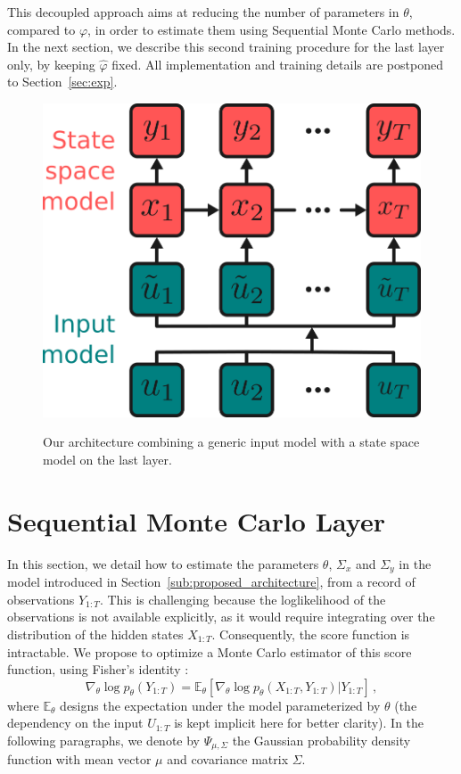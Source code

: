 \documentclass[conference]{IEEEtran}
\begin{document}
This decoupled approach aims at reducing the number of parameters in $\theta$, compared to $\varphi$, in order to estimate them using Sequential Monte Carlo methods.
In the next section, we describe this second training procedure for the last layer only, by keeping $\hat \varphi$ fixed.
All implementation and training details are postponed to Section~\ref{sec:exp}.

\begin{figure}[htpb]
	\centering
	\caption{Our architecture combining a generic input model with a state space model on the last layer.}
	\includegraphics[width=0.7\linewidth]{architecture.png}
	\label{fig:architecture}
\end{figure}

\section{Sequential Monte Carlo Layer}%
\label{sub:uncertainty_estimation}
In this section, we detail how to estimate the parameters $\theta$, $\Sigma_x$ and $\Sigma_y$ in the model introduced in Section~\ref{sub:proposed_architecture}, from a record of observations $Y_{1:T}$.
This is challenging because the loglikelihood of the observations is not available explicitly, as it would require integrating over the distribution of the hidden states $X_{1:T}$.
Consequently, the score function is intractable.
We propose to optimize a Monte Carlo estimator of this score function, using Fisher's identity \cite{monographie-randal}:
\begin{equation}
	\nabla_\theta \log p_\theta(Y_{1:T}) = \mathbb{E}_\theta \left[ \nabla_\theta\log p_\theta(X_{1:T}, Y_{1:T}) | Y_{1:T} \right]\,,
	\label{eq:grad_ll}
\end{equation}
where $\mathbb{E}_\theta$ designs the expectation under the model parameterized by $\theta$ (the dependency on the input $U_{1:T}$ is kept implicit here for better clarity).
In the following paragraphs, we denote by $\Psi_{\mu, \Sigma}$ the Gaussian probability density function with mean vector $\mu$ and covariance matrix $\Sigma$.
\end{document}
